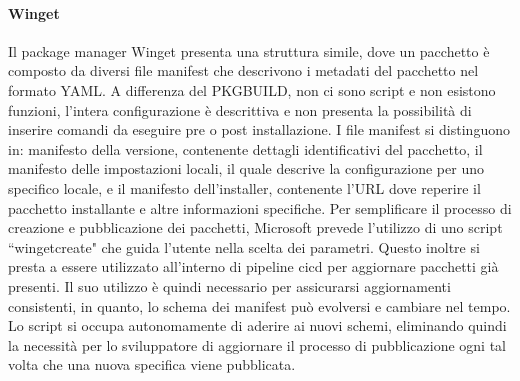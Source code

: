 \paragraph{Winget}\label{chap:winget} Il package manager Winget presenta una struttura simile, dove un pacchetto è composto da diversi file manifest che descrivono i metadati del pacchetto nel formato YAML. A differenza del PKGBUILD, non ci sono script e non esistono funzioni, l'intera configurazione è descrittiva e non presenta la possibilità di inserire comandi da eseguire pre o post installazione. I file manifest si distinguono in: manifesto della versione, contenente dettagli identificativi del pacchetto, il manifesto delle impostazioni locali, il quale descrive la configurazione per uno specifico locale, e il manifesto dell'installer, contenente l'URL dove reperire il pacchetto installante e altre informazioni specifiche. Per semplificare il processo di creazione e pubblicazione dei pacchetti, Microsoft prevede l'utilizzo di uno script ``wingetcreate" che guida l'utente nella scelta dei parametri. Questo inoltre si presta a essere utilizzato all'interno di pipeline \ac{cicd} per aggiornare pacchetti già presenti. Il suo utilizzo è quindi necessario per assicurarsi aggiornamenti consistenti, in quanto, lo schema dei manifest può evolversi e cambiare nel tempo. Lo script si occupa autonomamente di aderire ai nuovi schemi, eliminando quindi la necessità per lo sviluppatore di aggiornare il processo di pubblicazione ogni tal volta che una nuova specifica viene pubblicata.

